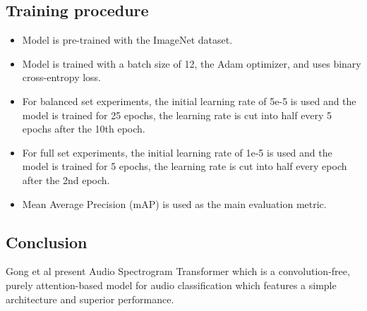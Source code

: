 \subsection{Training procedure}
\begin{itemize}
\item Model is pre-trained with the ImageNet dataset. 
\item Model is trained  with a batch size of 12, the Adam optimizer, and uses binary cross-entropy loss.
\item For balanced set experiments, the initial learning rate of 5e-5  is used and the model is trained for  25 epochs, the learning rate is cut into half every 5 epochs after the 10th epoch. 
\item For full set experiments, the  initial learning rate of 1e-5 is used and the model is trained for 5 epochs, the learning rate is cut into half every epoch after the 2nd epoch.
\item Mean Average Precision (mAP) is used as the main evaluation metric.
\end{itemize}

\subsection{Conclusion}
\par Gong et al present Audio Spectrogram Transformer \cite{ast} which is a convolution-free, purely attention-based model for audio classification which features a simple architecture and superior performance.
